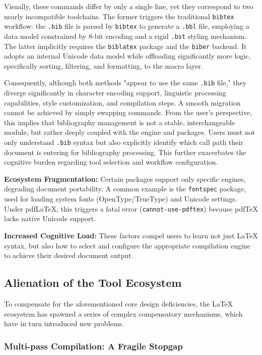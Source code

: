 Visually, these commands differ by only a single line, yet they correspond to two nearly incompatible toolchains. The former triggers the traditional \texttt{bibtex} workflow: the \texttt{.bib} file is parsed by \texttt{bibtex} to generate a \texttt{.bbl} file, employing a data model constrained by 8-bit encoding and a rigid \texttt{.bst} styling mechanism. The latter implicitly requires the \texttt{biblatex} package and the \texttt{biber} backend. It adopts an internal Unicode data model while offloading significantly more logic, specifically sorting, filtering, and formatting, to the macro layer.

Consequently, although both methods "appear to use the same \texttt{.bib} file," they diverge significantly in character encoding support, linguistic processing capabilities, style customization, and compilation steps. A smooth migration cannot be achieved by simply swapping commands. From the user's perspective, this implies that bibliography management is not a stable, interchangeable module, but rather deeply coupled with the engine and packages. Users must not only understand \texttt{.bib} syntax but also explicitly identify which call path their document is entering for bibliography processing. This further exacerbates the cognitive burden regarding tool selection and workflow configuration.

\textbf{Ecosystem Fragmentation:} Certain packages support only specific engines, degrading document portability. A common example is the \texttt{fontspec} package, used for loading system fonts (OpenType/TrueType) and Unicode settings. Under pdfLaTeX, this triggers a fatal error (\texttt{cannot-use-pdftex}) because pdf\TeX{} lacks native Unicode support.

\textbf{Increased Cognitive Load:} These factors compel users to learn not just \LaTeX{} syntax, but also how to select and configure the appropriate compilation engine to achieve their desired document output.

\subsection{Alienation of the Tool Ecosystem}

To compensate for the aforementioned core design deficiencies, the \LaTeX{} ecosystem has spawned a series of complex compensatory mechanisms, which have in turn introduced new problems.

\subsubsection{Multi-pass Compilation: A Fragile Stopgap}

